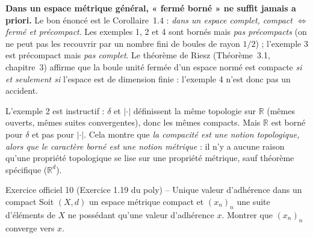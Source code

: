 \documentclass[11pt,a4paper]{article}
\newcommand{\R}{\mathbb{R}}
\theoremstyle{definition}
\begin{document}
\begin{pointcle}
\textbf{Dans un espace métrique général, « fermé borné » ne suffit jamais a priori.} Le bon énoncé est le Corollaire~1.4 : \emph{dans un espace complet, compact $\iff$ fermé et précompact}. Les exemples 1, 2 et 4 sont bornés mais \emph{pas précompacts} (on ne peut pas les recouvrir par un nombre fini de boules de rayon $1/2$) ; l'exemple 3 est précompact mais \emph{pas complet}. Le théorème de Riesz (Théorème~3.1, chapitre~3) affirme que la boule unité fermée d'un espace normé est compacte \emph{si et seulement si} l'espace est de dimension finie : l'exemple 4 n'est donc pas un accident.
\end{pointcle}

\begin{commentaire}
L'exemple 2 est instructif : $\delta$ et $|\cdot|$ définissent la même topologie sur $\R$ (mêmes ouverts, mêmes suites convergentes), donc les mêmes compacts. Mais $\R$ est borné pour $\delta$ et pas pour $|\cdot|$. Cela montre que \emph{la compacité est une notion topologique, alors que le caractère borné est une notion métrique} : il n'y a aucune raison qu'une propriété topologique se lise sur une propriété métrique, sauf théorème spécifique ($\R^d$).
\end{commentaire}

\begin{exo}{Exercice officiel 10 (Exercice 1.19 du poly) -- Unique valeur d'adhérence dans un compact}
Soit $(X,d)$ un espace métrique compact et $(x_n)_n$ une suite d'éléments de $X$ ne possédant qu'une valeur d'adhérence $x$. Montrer que $(x_n)_n$ converge vers $x$.
\end{exo}
\end{document}
